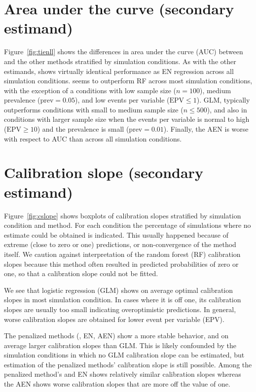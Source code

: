 \documentclass[a4paper, 11pt]{article}
\begin{document}
\section{Area under the curve (secondary estimand)}
Figure~\ref{fig:tienll} shows the differences in area under the curve (AUC)
between \ainet{} and the other methods stratified by simulation conditions.
As with the other estimands, \ainet{} shows virtually identical performance
as EN regression across all simulation conditions.
\ainet{} seems to outperform RF across most simulation conditions, with the
exception of a conditions with low sample size ($n = 100$), medium prevalence
($\mbox{prev} = 0.05$), and low events per variable ($\mbox{EPV} \leq 1$).
GLM, typically outperforms \ainet{} conditions with small to medium sample size
($n \leq 500$), and also in conditions with larger sample size when the
events per variable is normal to high ($\mbox{EPV} \geq 10$) and the prevalence
is small ($\mbox{prev}  = 0.01$).
Finally, the AEN is worse with respect to AUC than \ainet{} across all
simulation conditions.

\section{Calibration slope (secondary estimand)}
Figure~\ref{fig:cslope} shows boxplots of calibration slopes stratified by
simulation condition and method. For each condition the percentage of
simulations where no estimate could be obtained is indicated. This usually
happened because of extreme (close to zero or one) predictions, or
non-convergence of the method itself. We caution against interpretation of the
random forest (RF) calibration slopes because this method often resulted in
predicted probabilities of zero or one, so that a calibration slope could not
be fitted.

We see that logistic regression (GLM) shows on average optimal calibration slopes
in most simulation condition. In cases where it is off one, its calibration
slopes are usually too small indicating overoptimistic predictions. In general,
worse calibration slopes are obtained for lower event per variable (EPV).

The penalized methods (\ainet{}, EN, AEN) show a more stable behavior, and on
average larger calibration slopes than GLM. This is likely confounded by the
simulation conditions in which no GLM calibration slope can be estimated, but
estimation of the penalized methods' calibration slope is still possible. Among
the penalized method's \ainet{} and EN shows relatively similar calibration
slopes whereas the AEN shows worse calibration slopes that are more off the
value of one.
\end{document}
